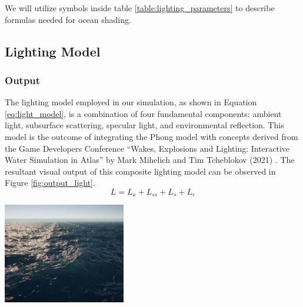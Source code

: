 We will utilize symbols inside table \ref{table:lighting_parameters} to describe formulas needed for ocean shading.

\subsection{Lighting Model}

\subsubsection{Output}

The lighting model employed in our simulation, as shown in Equation \ref{eq:light_model}, is a combination of four fundamental components: ambient light, subsurface scattering, specular light, and environmental reflection. This model is the outcome of integrating the Phong model with concepts derived from the Game Developers Conference “Wakes, Explosions and Lighting: Interactive Water Simulation in Atlas” by Mark Mihelich and Tim Tcheblokov (2021) \cite{mark2021}. The resultant visual output of this composite lighting model can be observed in Figure \ref{fig:output_light}.
\begin{equation}
    L = L_a + L_{ss} + L_s + L_r
    \label{eq:light_model}
\end{equation}
\begin{minipage}{1\textwidth}
    \centering
    \includegraphics[width=0.40\textwidth]{"images/output_light.png"}
    \label{fig:output_light}
\end{minipage}


